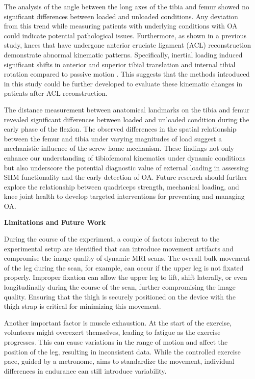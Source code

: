 \documentclass{micro-econ-thesis}
\begin{document}
The analysis of the angle between the long axes of the tibia and femur showed no significant differences between loaded and unloaded conditions. Any deviation from this trend while measuring patients with underlying conditions with OA could indicate potential pathological issues. Furthermore, as shown in a previous study, knees that have undergone anterior cruciate ligament (ACL) reconstruction demonstrate abnormal kinematic patterns. Specifically, inertial loading induced significant shifts in anterior and superior tibial translation and internal tibial rotation compared to passive motion \parencite{kaiser_effect_2017}. This suggests that the methods introduced in this study could be further developed to evaluate these kinematic changes in patients after ACL reconstruction. 

The distance measurement between anatomical landmarks on the tibia and femur revealed significant differences between loaded and unloaded condition during the early phase of the flexion. The observed differences in the spatial relationship between the femur and tibia under varying magnitudes of load suggest a mechanistic influence of the screw home mechanism. These findings not only enhance our understanding of tibiofemoral kinematics under dynamic conditions but also underscore the potential diagnostic value of external loading in assessing SHM functionality and the early detection of OA. Future research should further explore the relationship between quadriceps strength, mechanical loading, and knee joint health to develop targeted interventions for preventing and managing OA.



\textbf{Limitations and Future Work}

During the course of the experiment, a couple of factors inherent to the experimental setup are identified that can introduce movement artifacts and compromise the image quality of dynamic MRI scans. The overall bulk movement of the leg during the scan, for example, can occur if the upper leg is not fixated properly. Improper fixation can allow the upper leg to lift, shift laterally, or even longitudinally during the course of the scan, further compromising the image quality. Ensuring that the thigh is securely positioned on the device with the thigh strap is critical for minimizing this movement.

Another important factor is muscle exhaustion. At the start of the exercise, volunteers might overexert themselves, leading to fatigue as the exercise progresses. This can cause variations in the range of motion and affect the position of the leg, resulting in inconsistent data. While the controlled exercise pace, guided by a metronome, aims to standardize the movement, individual differences in endurance can still introduce variability.
\end{document}
